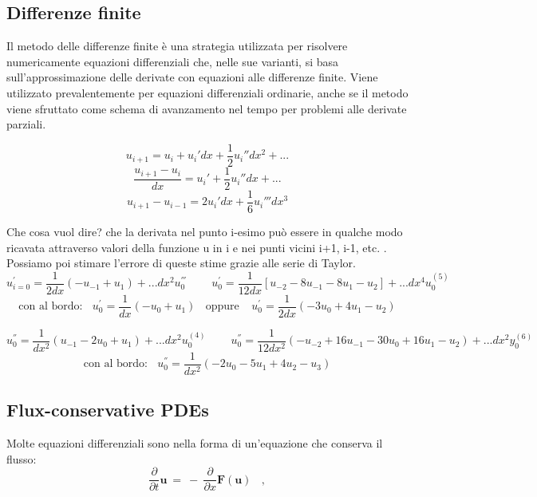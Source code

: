 \documentclass{article}
\begin{document}
	
	\vspace{1cm}
	\subsection{Differenze finite}
	
	Il metodo delle differenze finite è una strategia utilizzata per risolvere numericamente equazioni differenziali che, nelle sue varianti, si basa sull'approssimazione delle derivate con equazioni alle differenze finite. Viene utilizzato prevalentemente per equazioni differenziali ordinarie, anche se il metodo viene sfruttato come schema di avanzamento nel tempo per problemi alle derivate parziali.
	
	\[ u_{i+1}=u_i + u_i'dx + \frac{1}{2}u_i''dx^2 + ...  \]
	\[ \frac{u_{i+1}-u_i}{dx}= u_i' + \frac{1}{2}u_i''dx + ...  \]
	\[ u_{i+1}-u_{i-1} = 2u_i' dx + \frac{1}{6} u_i'''dx^3 \]
	
	Che cosa vuol dire? che la derivata nel punto i-esimo può essere in qualche modo ricavata attraverso valori della funzione u in i e nei punti vicini i+1, i-1, etc. .\\
	Possiamo poi stimare l'errore di queste stime grazie alle serie di Taylor.\\
	
	\[ u_{i=0}^{'} = \frac{1}{2dx} \left(- u_{-1} +u_1 \right) + ...dx^2 u_0^{'''}\ \ \ \ \ \ \ \ \ \ u_{0}^{'} = \frac{1}{12dx} \left[ u_{-2} - 8u_{-1} -  8u_1 - u_2\right]+ ...dx^4u_0^{(5)} \]
	\[ \text{con al bordo:}\ \ \ \ u^{'}_{0} = \frac{1}{dx} \left( -u_{0}+u_{1} \right) \ \ \ \ \text{oppure} \ \ \ \ \ u^{'}_{0}=\frac{1}{2dx} (-3u_0 + 4u_1 - u_2) \]
	
	\[ u_{0}^{''} = \frac{1}{dx^2} \left(u_{-1} -2u_0 + u_1 \right) + ...dx^2 u_0^{(4)}\ \ \ \ \ \ \ \ \ \ u_{0}^{''} = \frac{1}{12dx^2} \left( -u_{-2} +16u_{-1} -30u_0 + 16u_1 -u_2\right) + ...dx^2y_0^{(6)} \]
	\[ \text{con al bordo:}\ \ \ \  u^{''}_{0}=\frac{1}{dx^2} (-2u_0 -5u_{1}+4 u_2-u_3) \]
	
	
	
	\vspace{1cm}
	\subsection{Flux-conservative PDEs}
	Molte equazioni differenziali sono nella forma di un'equazione che conserva il flusso:
	\begin{equation}
		\boxed{\frac{\partial}{\partial t}\textbf{u}\ =\ -\ \frac{\partial}{\partial x}\textbf{F}(\textbf{u})}\ \ \ \ ,
	\end{equation}
	
\end{document}

